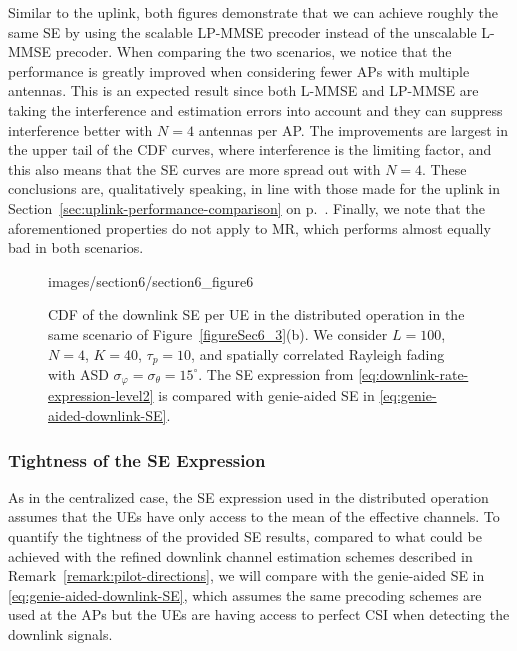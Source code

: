 Similar to the uplink, both figures demonstrate that we can achieve roughly the same SE by using the scalable LP-MMSE precoder instead of the unscalable L-MMSE precoder. When comparing the two scenarios, we notice that the performance is greatly improved when considering fewer APs with multiple antennas.
This is an expected result since both L-MMSE and LP-MMSE are taking the interference and estimation errors into account and they can suppress interference better with $N=4$ antennas per AP. 
The improvements are largest in the upper tail of the CDF curves, where interference is the limiting factor, and this also means that the SE curves are more spread out with $N=4$.
These conclusions are, qualitatively speaking, in line with those made for the uplink in Section~\ref{sec:uplink-performance-comparison} on p.~\pageref{sec:uplink-performance-comparison}.
Finally, we note that the aforementioned properties do not apply to MR, which performs almost equally bad in both scenarios.



\begin{figure}[t!]\centering
	\begin{overpic}[width=0.88\columnwidth,tics=10]{images/section6/section6_figure6}
	\end{overpic} 
	\caption{CDF of the downlink SE per UE in the distributed operation in the same scenario of Figure~\ref{figureSec6_3}(b). We consider $L=100$, $N=4$, $K=40$, $\tau_p=10$, and spatially correlated Rayleigh  fading with ASD $\sigma_{\varphi}=\sigma_{\theta}=15^{\circ}$. The SE expression from \eqref{eq:downlink-rate-expression-level2} is compared with genie-aided SE in \eqref{eq:genie-aided-downlink-SE}.}    \vspace{+2mm}
	\label{figureSec6_3x} 
\end{figure}

\subsubsection{Tightness of the SE Expression}


As in the centralized case, the SE expression used in the distributed operation assumes that the UEs have only access to the mean of the effective channels. To quantify the tightness of the provided SE results, compared to what could be achieved with the refined downlink channel estimation schemes described in Remark~\ref{remark:pilot-directions}, we will compare with the genie-aided SE in \eqref{eq:genie-aided-downlink-SE}, which assumes the same precoding schemes are used at the APs but the UEs are having access to perfect CSI when detecting the downlink signals.

